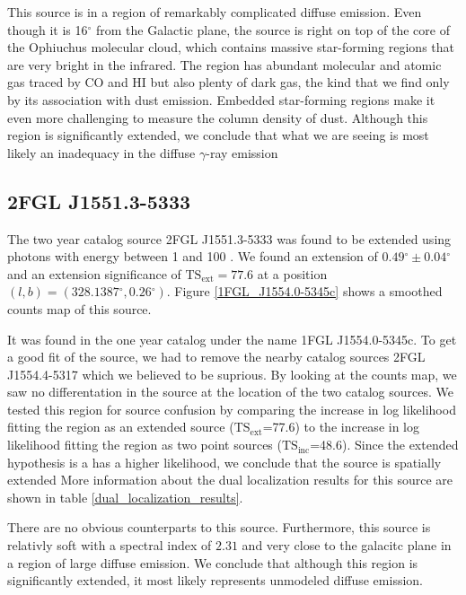 \documentclass[12pt,preprint]{aastex}
\newcommand{\gev}{\text{GeV}\xspace}
\newcommand{\tsext}{{\ensuremath{\text{TS}_\text{ext}}}\xspace}
\newcommand{\tsinc}{\ensuremath{\text{TS}_\text{inc}}\xspace}
\renewcommand{\deg}{\ensuremath{^\circ}\xspace}
\begin{document}
This source is in a region of remarkably complicated diffuse emission.
Even though it is 16\deg from the Galactic plane,
the source is right on top of the core of the Ophiuchus molecular cloud,
which contains massive star-forming regions that are very bright
in the infrared.  The region has abundant molecular and atomic gas
traced by CO and HI but also plenty of dark gas, the kind that
we find only by its association with dust emission.
Embedded star-forming regions make it even more challenging to measure
the column density of dust.
Although this region is significantly extended, we conclude that what we
are seeing is most likely an inadequacy in the diffuse $\gamma$-ray emission


\subsection{2FGL J1551.3-5333}


The two year catalog source 2FGL J1551.3-5333 was found to be
extended using photons with energy between 1 \gev and 100 \gev.
We found an extension of $0.49\deg\pm 0.04\deg$ and an extension significance of
$\tsext=77.6$ at a position $(l,b)=(328.1387\deg,0.26\deg)$.  Figure
\ref{1FGL_J1554.0-5345c} shows a smoothed counts map of this source.

It was found in the one year catalog under the name 1FGL J1554.0-5345c.
To get a good fit of the source, we had to remove the nearby catalog
sources 2FGL J1554.4-5317 which we believed to be suprious. By looking at
the counts map, we saw no differentation in the source at the location
of the two catalog sources. We tested this region for source confusion
by comparing the increase in log likelihood fitting the region as an
extended source (\tsext=77.6) to the increase in log likelihood fitting
the region as two point sources (\tsinc=48.6).  Since the extended
hypothesis is a has a higher likelihood, we conclude that the source is
spatially extended More
information about the dual localization results for this source are
shown in table \ref{dual_localization_results}.

There are no obvious counterparts to this source. Furthermore, this
source is relativly soft with a spectral index of $2.31$ and
very close to the galacitc plane in a region of large diffuse emission.
We conclude that although this region is significantly extended, it most
likely represents unmodeled diffuse emission.
\end{document}
